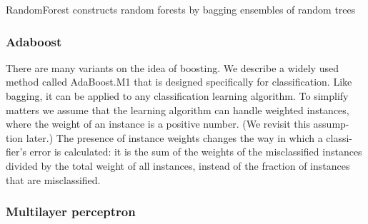 \documentclass[conference,a4paper]{IEEEtran}
\begin{document}
RandomForest constructs random forests by bagging ensembles of random trees

\subsubsection{Adaboost}

There are many variants on the idea of boosting. We describe a widely used method called AdaBoost.M1 that is designed specifically for classification. Like bagging, it can be applied to any classification learning algorithm. To simplify matters we assume that the learning algorithm can handle weighted instances, where the weight of an instance is a positive number. (We revisit this assump- tion later.) The presence of instance weights changes the way in which a classi- fier’s error is calculated: it is the sum of the weights of the misclassified instances divided by the total weight of all instances, instead of the fraction of instances that are misclassified.

\subsubsection{Multilayer perceptron}
\end{document}
